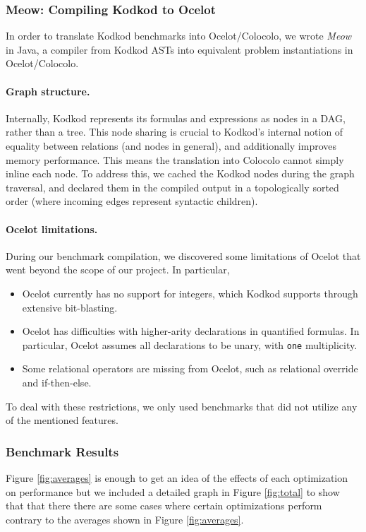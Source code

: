 \documentclass[10pt]{article}
\theoremstyle{definition}
\begin{document}
  \subsubsection{Meow: Compiling Kodkod to Ocelot}
  In order to translate Kodkod benchmarks into Ocelot/Colocolo, we wrote \emph{Meow} in Java, a compiler from Kodkod ASTs into equivalent problem instantiations in Ocelot/Colocolo.
  \paragraph{Graph structure.} Internally, Kodkod represents its formulas and expressions as nodes in a DAG, rather than a tree. This node sharing is crucial to Kodkod's internal notion of equality between relations (and nodes in general), and additionally improves memory performance. This means the translation into Colocolo cannot simply inline each node. To address this, we cached the Kodkod nodes during the graph traversal, and declared them in the compiled output in a topologically sorted order (where incoming edges represent syntactic children).

  \paragraph{Ocelot limitations.} During our benchmark compilation, we discovered some limitations of Ocelot that went beyond the scope of our project. In particular,
  \begin{itemize}
    \item Ocelot currently has no support for integers, which Kodkod supports through extensive bit-blasting.
    \item Ocelot has difficulties with higher-arity declarations in quantified formulas. In particular, Ocelot assumes all declarations to be unary, with \texttt{one} multiplicity.
    \item Some relational operators are missing from Ocelot, such as relational override and if-then-else.
  \end{itemize}
  To deal with these restrictions, we only used benchmarks that did not utilize any of the mentioned features.
  
  
  \subsubsection{Benchmark Results}

  Figure \ref{fig:averages} is enough to get an idea of the effects of each optimization on performance but we included a detailed graph in Figure \ref{fig:total} to show that that there there are some cases where certain optimizations perform contrary to the averages shown in Figure \ref{fig:averages}.
\end{document}
